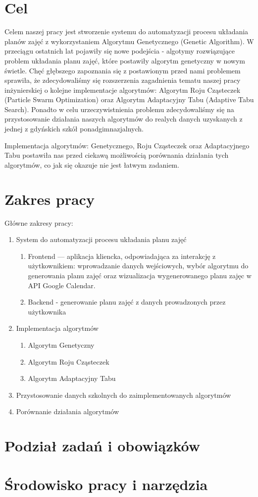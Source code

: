 \section{Cel}
\par Celem naszej pracy jest stworzenie systemu do automatyzacji procesu układania planów zajęć z wykorzystaniem Algorytmu Genetycznego (Genetic Algorithm).  W przeciągu ostatnich lat pojawiły się nowe podejścia - algotymy rozwiązujące problem układania planu zajęć, które postawiły algorytm genetyczny w nowym świetle. Chęć głębszego zapoznania się z postawionym przed nami problemem sprawiła, że zdecydowaliśmy się rozszerzenia zagadnienia tematu naszej pracy inżynierskiej o kolejne implementacje algorytmów: Algorytm Roju Cząsteczek (Particle Swarm Optimization) oraz Algorytm Adaptacyjny Tabu (Adaptive Tabu Search). Ponadto w celu urzeczywistnienia problemu zdecydowaliśmy się na przystosowanie działania naszych algorytmów do realych danych uzyskanych z jednej z gdyńskich szkół ponadgimnazjalnych.
\par Implementacja algorytmów: Genetycznego, Roju Cząsteczek oraz Adaptacyjnego Tabu postawiła nas przed ciekawą możliwością porównania działania tych algorytmów, co jak się okazuje nie jest łatwym zadaniem.
\section{Zakres pracy}
\par Główne zakresy pracy:
\begin{enumerate}
\item System do automatyzacji procesu układania planu zajęć
\begin{enumerate}
\item Frontend — aplikacja kliencka, odpowiadająca za interakcję z użytkownikiem: wprowadzanie danych wejściowych, wybór algorytmu do generowania planu zajęć oraz wizualizacja wygenerowanego planu zajęc w API Google Calendar.
\item Backend - generowanie planu zajęć z danych prowadzonych przez użytkownika 
\end{enumerate}
\item Implementacja algorytmów
\begin{enumerate}
\item Algorytm Genetyczny
\item Algorytm Roju Cząsteczek
\item Algorytm Adaptacyjny Tabu
\end{enumerate}
\item Przystosowanie danych szkolnych do zaimplementowanych algorytmów
\item Porównanie działania algorytmów



\end{enumerate}


\section{Podział zadań i obowiązków}
\section{Środowisko pracy i narzędzia}
